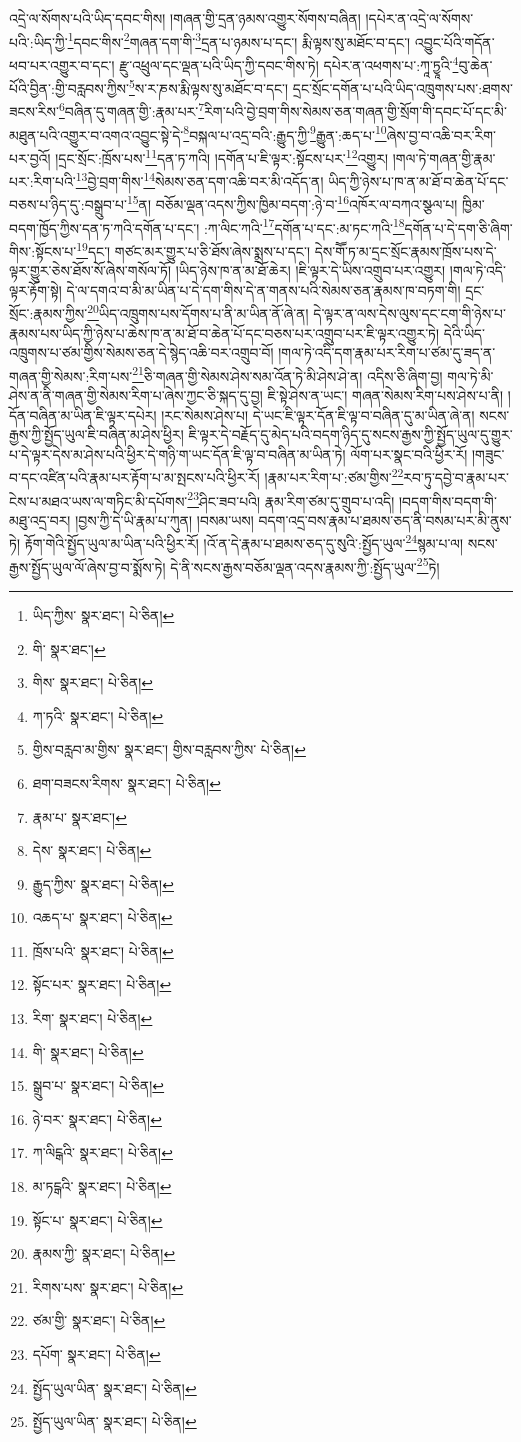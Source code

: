 འདྲེ་ལ་སོགས་པའི་ཡིད་དབང་གིས། །གཞན་གྱི་དྲན་ཉམས་འགྱུར་སོགས་བཞིན། །དཔེར་ན་འདྲེ་ལ་སོགས་པའི་:ཡིད་ཀྱི་\footnote{ཡིད་ཀྱིས་  སྣར་ཐང་།  པེ་ཅིན། }དབང་གིས་\footnote{གི་  སྣར་ཐང་། }གཞན་དག་གི་\footnote{གིས་  སྣར་ཐང་།  པེ་ཅིན། }དྲན་པ་ཉམས་པ་དང་། རྨི་ལྟས་སུ་མཐོང་བ་དང་། འབྱུང་པོའི་གདོན་ཕབ་པར་འགྱུར་བ་དང་། རྫུ་འཕྲུལ་དང་ལྡན་པའི་ཡིད་ཀྱི་དབང་གིས་ཏེ། དཔེར་ན་འཕགས་པ་:ཀཱ་ཏྱཱའི་\footnote{ཀ་ཏའི་  སྣར་ཐང་།  པེ་ཅིན། }བུ་ཆེན་པོའི་བྱིན་:གྱི་བརླབས་ཀྱིས་\footnote{གྱིས་བརླབ་མ་གྱིས་  སྣར་ཐང་། གྱིས་བརླབས་ཀྱིས་  པེ་ཅིན། }ས་ར་ཎས་རྨི་ལྟས་སུ་མཐོང་བ་དང་། དྲང་སྲོང་དགོན་པ་པའི་ཡིད་འཁྲུགས་པས་:ཐགས་ཟངས་རིས་\footnote{ཐག་བཟངས་རིགས་  སྣར་ཐང་།  པེ་ཅིན། }བཞིན་དུ་གཞན་གྱི་:རྣམ་པར་\footnote{རྣམ་པ་  སྣར་ཐང་། }རིག་པའི་བྱེ་བྲག་གིས་སེམས་ཅན་གཞན་གྱི་སྲོག་གི་དབང་པོ་དང་མི་མཐུན་པའི་འགྱུར་བ་འགའ་འབྱུང་སྟེ་དེ་\footnote{དེས་  སྣར་ཐང་།  པེ་ཅིན། }བསྐལ་པ་འདྲ་བའི་:རྒྱུད་ཀྱི་\footnote{རྒྱུད་ཀྱིས་  སྣར་ཐང་།  པེ་ཅིན། }རྒྱུན་:ཆད་པ་\footnote{འཆད་པ་  སྣར་ཐང་།  པེ་ཅིན། }ཞེས་བྱ་བ་འཆི་བར་རིག་པར་བྱའོ། །དྲང་སྲོང་:ཁྲོས་པས་\footnote{ཁྲོས་པའི་  སྣར་ཐང་།  པེ་ཅིན། }དན་ཏ་ཀའི། །དགོན་པ་ཇི་ལྟར་:སྟོངས་པར་\footnote{སྟོང་པར་  སྣར་ཐང་།  པེ་ཅིན། }འགྱུར། །གལ་ཏེ་གཞན་གྱི་རྣམ་པར་:རིག་པའི་\footnote{རིག་  སྣར་ཐང་།  པེ་ཅིན། }བྱེ་བྲག་གིས་\footnote{གི་  སྣར་ཐང་།  པེ་ཅིན། }སེམས་ཅན་དག་འཆི་བར་མི་འདོད་ན། ཡིད་ཀྱི་ཉེས་པ་ཁ་ན་མ་ཐོ་བ་ཆེན་པོ་དང་བཅས་པ་ཉིད་དུ་:བསྒྲུབ་པ་\footnote{སྒྲུབ་པ་  སྣར་ཐང་།  པེ་ཅིན། }ན། བཅོམ་ལྡན་འདས་ཀྱིས་ཁྱིམ་བདག་:ཉེ་བ་\footnote{ཉེ་བར་  སྣར་ཐང་།  པེ་ཅིན། }འཁོར་ལ་བཀའ་སྩལ་པ། ཁྱིམ་བདག་ཁྱོད་ཀྱིས་དན་ཏ་ཀའི་དགོན་པ་དང་། :ཀ་ལིང་ཀའི་\footnote{ཀ་ལིངྒའི་  སྣར་ཐང་།  པེ་ཅིན། }དགོན་པ་དང་:མ་ཏང་ཀའི་\footnote{མ་ཏངྒའི་  སྣར་ཐང་།  པེ་ཅིན། }དགོན་པ་དེ་དག་ཅི་ཞིག་གིས་:སྟོངས་པ་\footnote{སྟོང་པ་  སྣར་ཐང་།  པེ་ཅིན། }དང་། གཙང་མར་གྱུར་པ་ཅི་ཐོས་ཞེས་སྨྲས་པ་དང་། དེས་གཽ་ཏ་མ་དྲང་སྲོང་རྣམས་ཁྲོས་པས་དེ་ལྟར་གྱུར་ཅེས་ཐོས་སོ་ཞེས་གསོལ་ཏོ། །ཡིད་ཉེས་ཁ་ན་མ་ཐོ་ཆེར། །ཇི་ལྟར་དེ་ཡིས་འགྲུབ་པར་འགྱུར། །གལ་ཏེ་འདི་ལྟར་རྟོག་སྟེ། དེ་ལ་དགའ་བ་མི་མ་ཡིན་པ་དེ་དག་གིས་དེ་ན་གནས་པའི་སེམས་ཅན་རྣམས་ཁ་བཏག་གི། དྲང་སྲོང་:རྣམས་ཀྱིས་\footnote{རྣམས་ཀྱི་  སྣར་ཐང་།  པེ་ཅིན། }ཡིད་འཁྲུགས་པས་དོགས་པ་ནི་མ་ཡིན་ནོ་ཞེ་ན། དེ་ལྟར་ན་ལས་དེས་ལུས་དང་ངག་གི་ཉེས་པ་རྣམས་པས་ཡིད་ཀྱི་ཉེས་པ་ཆེས་ཁ་ན་མ་ཐོ་བ་ཆེན་པོ་དང་བཅས་པར་འགྲུབ་པར་ཇི་ལྟར་འགྱུར་ཏེ། དེའི་ཡིད་འཁྲུགས་པ་ཙམ་གྱིས་སེམས་ཅན་དེ་སྙེད་འཆི་བར་འགྲུབ་བོ། །གལ་ཏེ་འདི་དག་རྣམ་པར་རིག་པ་ཙམ་དུ་ཟད་ན་གཞན་གྱི་སེམས་:རིག་པས་\footnote{རིགས་པས་  སྣར་ཐང་།  པེ་ཅིན། }ཅི་གཞན་གྱི་སེམས་ཤེས་སམ་འོན་ཏེ་མི་ཤེས་ཤེ་ན། འདིས་ཅི་ཞིག་བྱ། གལ་ཏེ་མི་ཤེས་ན་ནི་གཞན་གྱི་སེམས་རིག་པ་ཞེས་ཀྱང་ཅི་སྐད་དུ་བྱ། ཇི་སྟེ་ཤེས་ན་ཡང་། གཞན་སེམས་རིག་པས་ཤེས་པ་ནི། །དོན་བཞིན་མ་ཡིན་ཇི་ལྟར་དཔེར། །རང་སེམས་ཤེས་པ། དེ་ཡང་ཇི་ལྟར་དོན་ཇི་ལྟ་བ་བཞིན་དུ་མ་ཡིན་ཞེ་ན། སངས་རྒྱས་ཀྱི་སྤྱོད་ཡུལ་ཇི་བཞིན་མ་ཤེས་ཕྱིར། ཇི་ལྟར་དེ་བརྗོད་དུ་མེད་པའི་བདག་ཉིད་དུ་སངས་རྒྱས་ཀྱི་སྤྱོད་ཡུལ་དུ་གྱུར་པ་དེ་ལྟར་དེས་མ་ཤེས་པའི་ཕྱིར་དེ་གཉི་ག་ཡང་དོན་ཇི་ལྟ་བ་བཞིན་མ་ཡིན་ཏེ། ལོག་པར་སྣང་བའི་ཕྱིར་རོ། །གཟུང་བ་དང་འཛིན་པའི་རྣམ་པར་རྟོག་པ་མ་སྤངས་པའི་ཕྱིར་རོ། །རྣམ་པར་རིག་པ་:ཙམ་གྱིས་\footnote{ཙམ་གྱི་  སྣར་ཐང་།  པེ་ཅིན། }རབ་ཏུ་དབྱེ་བ་རྣམ་པར་ངེས་པ་མཐའ་ཡས་ལ་གཏིང་མི་དཔོགས་\footnote{དཔོག་  སྣར་ཐང་།  པེ་ཅིན། }ཤིང་ཟབ་པའི། རྣམ་རིག་ཙམ་དུ་གྲུབ་པ་འདི། །བདག་གིས་བདག་གི་མཐུ་འདྲ་བར། །བྱས་ཀྱི་དེ་ཡི་རྣམ་པ་ཀུན། །བསམ་ཡས། བདག་འདྲ་བས་རྣམ་པ་ཐམས་ཅད་ནི་བསམ་པར་མི་ནུས་ཏེ། རྟོག་གེའི་སྤྱོད་ཡུལ་མ་ཡིན་པའི་ཕྱིར་རོ། །འོ་ན་དེ་རྣམ་པ་ཐམས་ཅད་དུ་སུའི་:སྤྱོད་ཡུལ་\footnote{སྤྱོད་ཡུལ་ཡིན་  སྣར་ཐང་།  པེ་ཅིན། }སྙམ་པ་ལ། སངས་རྒྱས་སྤྱོད་ཡུལ་ལོ་ཞེས་བྱ་བ་སྨོས་ཏེ། དེ་ནི་སངས་རྒྱས་བཅོམ་ལྡན་འདས་རྣམས་ཀྱི་:སྤྱོད་ཡུལ་\footnote{སྤྱོད་ཡུལ་ཡིན་  སྣར་ཐང་།  པེ་ཅིན། }ཏེ། 